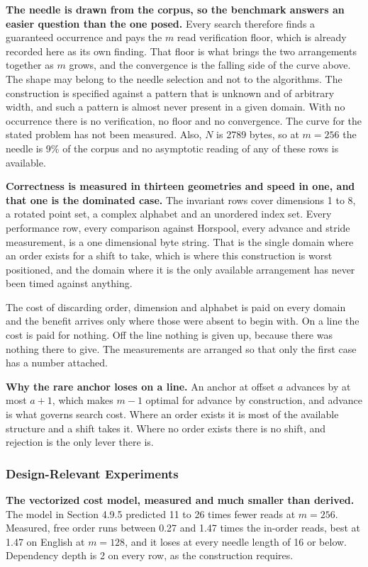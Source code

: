 \textbf{The needle is drawn from the corpus, so the benchmark answers an easier question than the one posed.} Every search therefore finds a guaranteed occurrence and pays the \(m\) read verification floor, which is already recorded here as its own finding. That floor is what brings the two arrangements together as \(m\) grows, and the convergence is the falling side of the curve above. The shape may belong to the needle selection and not to the algorithms. The construction is specified against a pattern that is unknown and of arbitrary width, and such a pattern is almost never present in a given domain. With no occurrence there is no verification, no floor and no convergence. The curve for the stated problem has not been measured. Also, \(N\) is 2789 bytes, so at \(m = 256\) the needle is 9\% of the corpus and no asymptotic reading of any of these rows is available.

\textbf{Correctness is measured in thirteen geometries and speed in one, and that one is the dominated case.} The invariant rows cover dimensions 1 to 8, a rotated point set, a complex alphabet and an unordered index set. Every performance row, every comparison against Horspool, every advance and stride measurement, is a one dimensional byte string. That is the single domain where an order exists for a shift to take, which is where this construction is worst positioned, and the domain where it is the only available arrangement has never been timed against anything.

The cost of discarding order, dimension and alphabet is paid on every domain and the benefit arrives only where those were absent to begin with. On a line the cost is paid for nothing. Off the line nothing is given up, because there was nothing there to give. The measurements are arranged so that only the first case has a number attached.

\textbf{Why the rare anchor loses on a line.} An anchor at offset \(a\) advances by at most \(a+1\), which makes \(m-1\) optimal for advance by construction, and advance is what governs search cost. Where an order exists it is most of the available structure and a shift takes it. Where no order exists there is no shift, and rejection is the only lever there is.

\subsubsection{Design-Relevant Experiments}

\textbf{The vectorized cost model, measured and much smaller than derived.} The model in Section 4.9.5 predicted 11 to 26 times fewer reads at \(m = 256\). Measured, free order runs between 0.27 and 1.47 times the in-order reads, best at 1.47 on English at \(m = 128\), and it loses at every needle length of 16 or below. Dependency depth is 2 on every row, as the construction requires.

